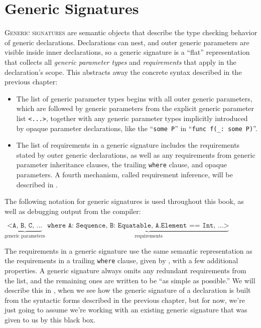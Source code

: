 \documentclass[../generics]{subfiles}
\begin{document}
\chapter{Generic Signatures}\label{genericsig}

\lettrine{G}{eneric signatures} are semantic objects that describe the type checking behavior of generic declarations. Declarations can nest, and outer generic parameters are visible inside inner declarations, so a generic signature is a ``flat'' representation that collects all \emph{generic parameter types} and \emph{requirements} that apply in the declaration's scope. This abstracts away the concrete syntax described in the previous chapter:
\begin{itemize}
\item The list of generic parameter types begins with all outer generic parameters, which are followed by generic parameters from the explicit generic parameter list \texttt{<...>}, together with any generic parameter types implicitly introduced by opaque parameter declarations, like the ``\texttt{some P}'' in ``\verb|func f(_: some P)|''.
\item The list of requirements in a generic signature includes the requirements stated by outer generic declarations, as well as any requirements from generic parameter inheritance clauses, the trailing \texttt{where} clause, and opaque parameters. A fourth mechanism, called requirement inference, will be described in .
\end{itemize}

The following notation for generic signatures is used throughout this book, as well as debugging output from the compiler:
\begin{center}
$\underbrace{\texttt{<A, B, C, ...}}_{\text{generic parameters}}\texttt{ where }\underbrace{\texttt{A:\ Sequence, B:\ Equatable, A.Element == Int, ...>}}_{\text{requirements}}$
\end{center}

The requirements in a generic signature use the same semantic representation as the requirements in a trailing \texttt{where} clause, given by , with a few additional properties. A generic signature always omits any redundant requirements from the list, and the remaining ones are written to be ``as simple as possible.'' We will describe this in , when we see how the generic signature of a declaration is built from the syntactic forms described in the previous chapter, but for now, we're just going to assume we're working with an existing generic signature that was given to us by this black box.
\end{document}

